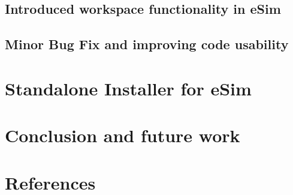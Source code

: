 \documentclass[12pt,a4paper]{report}
\begin{document}
\section{Introduced workspace functionality in eSim}
\section{Minor Bug Fix and improving code usability}

\chapter{\textbf{Standalone Installer for eSim}}

\chapter{\textbf{Conclusion and future work}}

\chapter{\textbf{References}}
\end{document}
